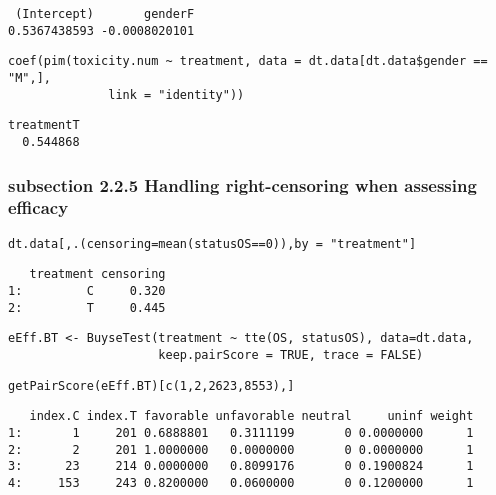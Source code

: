 \documentclass[12pt]{article}
\begin{document}
\begin{verbatim}
 (Intercept)       genderF 
0.5367438593 -0.0008020101
\end{verbatim}


\lstset{language=r,label= ,caption= ,captionpos=b,numbers=none}
\begin{lstlisting}
coef(pim(toxicity.num ~ treatment, data = dt.data[dt.data$gender == "M",],
              link = "identity"))
\end{lstlisting}

\begin{verbatim}
treatmentT 
  0.544868
\end{verbatim}

\subsubsection{subsection 2.2.5 Handling right-censoring when assessing efficacy}
\label{sec:org14b9048}

\lstset{language=r,label= ,caption= ,captionpos=b,numbers=none}
\begin{lstlisting}
dt.data[,.(censoring=mean(statusOS==0)),by = "treatment"]
\end{lstlisting}

\begin{verbatim}
   treatment censoring
1:         C     0.320
2:         T     0.445
\end{verbatim}


\lstset{language=r,label= ,caption= ,captionpos=b,numbers=none}
\begin{lstlisting}
eEff.BT <- BuyseTest(treatment ~ tte(OS, statusOS), data=dt.data,
                     keep.pairScore = TRUE, trace = FALSE)
\end{lstlisting}

\lstset{language=r,label= ,caption= ,captionpos=b,numbers=none}
\begin{lstlisting}
getPairScore(eEff.BT)[c(1,2,2623,8553),]
\end{lstlisting}

\begin{verbatim}
   index.C index.T favorable unfavorable neutral     uninf weight
1:       1     201 0.6888801   0.3111199       0 0.0000000      1
2:       2     201 1.0000000   0.0000000       0 0.0000000      1
3:      23     214 0.0000000   0.8099176       0 0.1900824      1
4:     153     243 0.8200000   0.0600000       0 0.1200000      1
\end{verbatim}
\end{document}
